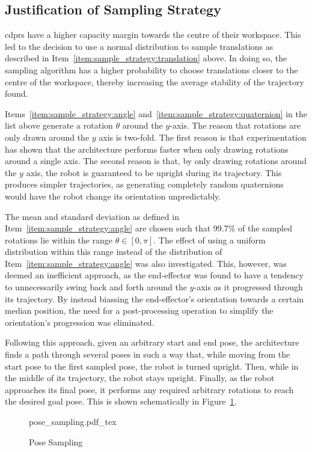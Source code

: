 	\subsection{Justification of Sampling Strategy}%
	\label{sec:justification_of_sampling_strategy}

		\glspl{cdpr} have a higher capacity margin towards the centre of
		their workspace. This led to the decision
		to use a normal distribution to sample translations as described in
		Item~\ref{item:sample_strategy:translation} above. In doing so,
		the sampling algorithm has a higher probability to choose
		translations closer to the centre of the workspace, thereby
		increasing the average stability of the trajectory found.

		Items~\ref{item:sample_strategy:angle}
		and~\ref{item:sample_strategy:quaternion} in the list above generate
		a rotation $\theta$ around the $y$-axis. The reason that rotations
		are only drawn around the $y$ axis is two-fold. The first reason is
		that experimentation has shown that the architecture performs faster
		when only drawing rotations around a single axis. The second reason is that, by only drawing rotations
		around the $y$ axis, the robot is guaranteed to be upright during
		its trajectory. This produces simpler trajectories, as generating
		completely random quaternions would have the robot change its
		orientation unpredictably.

		The mean and standard deviation as defined in
		Item~\ref{item:sample_strategy:angle} are chosen such that 99.7\% of
		the sampled rotations lie within the range $\theta \in [0, \pi]$.
		The effect of using a uniform distribution within this range instead
		of the distribution of Item~\ref{item:sample_strategy:angle} was
		also investigated. This, however, was deemed an inefficient
		approach, as the end-effector was found to have a tendency to
		unnecessarily swing back and forth around the $y$-axis as it
		progressed through its trajectory. By instead biassing the
		end-effector's orientation towards a certain median position, the
		need for a post-processing operation to simplify the orientation's
		progression was eliminated.

		Following this approach, given an arbitrary start and end pose, the
		architecture finds a path through several poses in such a way that,
		while moving from the start pose to the first sampled pose, the
		robot is turned upright. Then, while in the middle of its
		trajectory, the robot stays upright. Finally, as the robot
		approaches its final pose, it performs any required arbitrary
		rotations to reach the desired goal pose. This is shown
		schematically in Figure~\ref{fig:pose_sampling}.

		\begin{figure}[hb]
			\centering
			\def\svgwidth{\columnwidth}
			{pose_sampling.pdf_tex}
			\caption{Pose Sampling}%
			\label{fig:pose_sampling}
		\end{figure}


